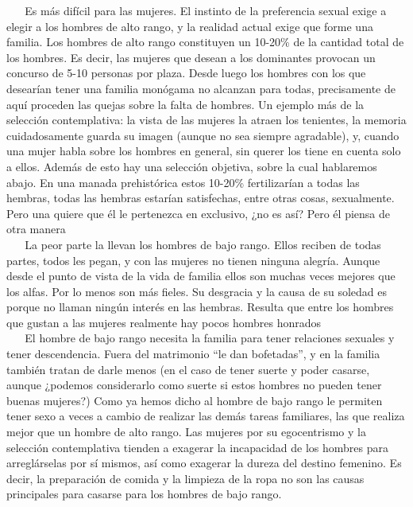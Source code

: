 \hspace*{0.333em} ~ ~ Es más difícil para las mujeres. El instinto de la
preferencia sexual exige a elegir a los hombres de alto rango, y la
realidad actual exige que forme una familia. Los hombres de alto rango
constituyen un 10-20\% de la cantidad total de los hombres. Es decir,
las mujeres que desean a los dominantes provocan un concurso de 5-10
personas por plaza. Desde luego los hombres con los que desearían tener
una familia monógama no alcanzan para todas, precisamente de aquí
proceden las quejas sobre la falta de hombres. Un ejemplo más de la
selección contemplativa: la vista de las mujeres la atraen los
tenientes, la memoria cuidadosamente guarda su imagen (aunque no sea
siempre agradable), y, cuando una mujer habla sobre los hombres en
general, sin querer los tiene en cuenta solo a ellos. Además de esto hay
una selección objetiva, sobre la cual hablaremos abajo. En una manada
prehistórica estos 10-20\% fertilizarían a todas las hembras, todas las
hembras estarían satisfechas, entre otras cosas, sexualmente. Pero una
quiere que él le pertenezca en exclusivo, ¿no es así? Pero él piensa de
otra manera\\
\hspace*{0.333em} ~ ~ La peor parte la llevan los hombres de bajo rango.
Ellos reciben de todas partes, todos les pegan, y con las mujeres no
tienen ninguna alegría. Aunque desde el punto de vista de la vida de
familia ellos son muchas veces mejores que los alfas. Por lo menos son
más fieles. Su desgracia y la causa de su soledad es porque no llaman
ningún interés en las hembras. Resulta que entre los hombres que gustan
a las mujeres realmente hay pocos hombres honrados\\
\hspace*{0.333em} ~ ~ El hombre de bajo rango necesita la familia para
tener relaciones sexuales y tener descendencia. Fuera del matrimonio
``le dan bofetadas'', y en la familia también tratan de darle menos (en
el caso de tener suerte y poder casarse, aunque ¿podemos considerarlo
como suerte si estos hombres no pueden tener buenas mujeres?) Como ya
hemos dicho al hombre de bajo rango le permiten tener sexo a veces a
cambio de realizar las demás tareas familiares, las que realiza mejor
que un hombre de alto rango. Las mujeres por su egocentrismo y la
selección contemplativa tienden a exagerar la incapacidad de los hombres
para arreglárselas por sí mismos, así como exagerar la dureza del
destino femenino. Es decir, la preparación de comida y la limpieza de la
ropa no son las causas principales para casarse para los hombres de bajo
rango.

